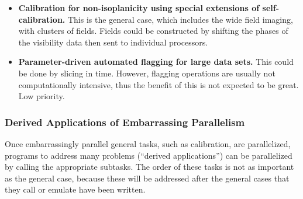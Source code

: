 \begin{itemize}
\item {\bf Calibration for non-isoplanicity using special extensions
of self-calibration.}  This is the general case, which includes the
wide field imaging, with clusters of fields.  Fields could be
constructed by shifting the phases of the visibility data then sent to
individual processors.

\item {\bf Parameter-driven automated flagging for large data sets.}
This could be done by slicing in time.  However, flagging operations
are usually not computationally intensive, thus the benefit of this is
not expected to be great.  Low priority.

\end{itemize}

\subsubsection{Derived Applications of Embarrassing Parallelism}

\label{derived1}

Once embarrassingly parallel general tasks, such as calibration, are
parallelized, programs to address many problems (``derived
applications'') can be parallelized by calling the appropriate
subtasks.  The order of these tasks is not as important as the general
case, because these will be addressed after the general cases that
they call or emulate have been written.

